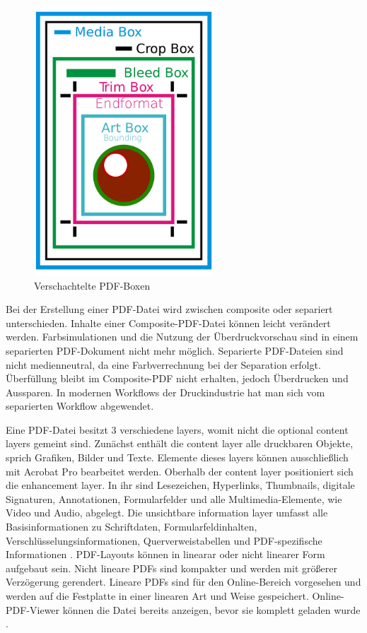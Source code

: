 \begin{figure}[!htb]
	\centering
	\includegraphics[width=0.6\textwidth]{"images/boxen-wiki-pdf-de.png"}
	\caption{Verschachtelte PDF-Boxen \cite{wiki-pdf-de}}
	\label{fig:boxen}
\end{figure}

Bei der Erstellung einer PDF-Datei wird zwischen composite oder separiert unterschieden. Inhalte einer Composite-PDF-Datei können leicht verändert werden. Farbsimulationen und die Nutzung der Überdruckvorschau sind in einem separierten PDF-Dokument nicht mehr möglich. Separierte PDF-Dateien sind nicht medienneutral, da eine Farbverrechnung bei der Separation erfolgt. Überfüllung bleibt im Composite-PDF nicht erhalten, jedoch Überdrucken und Aussparen. In modernen Workflows der Druckindustrie hat man sich vom separierten Workflow abgewendet.
\par
Eine PDF-Datei besitzt 3 verschiedene layers, womit nicht die optional content layers gemeint sind. Zunächst enthält die content layer alle druckbaren Objekte, sprich Grafiken, Bilder und Texte. Elemente dieses layers können ausschließlich mit Acrobat Pro bearbeitet werden. Oberhalb der content layer positioniert sich die enhancement layer. In ihr sind Lesezeichen, Hyperlinks, Thumbnails, digitale Signaturen, Annotationen, Formularfelder und alle Multimedia-Elemente, wie Video und Audio, abgelegt. Die unsichtbare information layer umfasst alle Basisinformationen zu Schriftdaten, Formularfeldinhalten, Verschlüsselungsinformationen, Querverweistabellen und PDF-spezifische Informationen \cite{schneeberger}. PDF-Layouts können in linearar oder nicht linearer Form aufgebaut sein. Nicht lineare PDFs sind kompakter und werden mit größerer Verzögerung gerendert. Lineare PDFs sind für den Online-Bereich vorgesehen und werden auf die Festplatte in einer linearen Art und Weise gespeichert. Online-PDF-Viewer können die Datei bereits anzeigen, bevor sie komplett geladen wurde \cite{fileformat}. 

